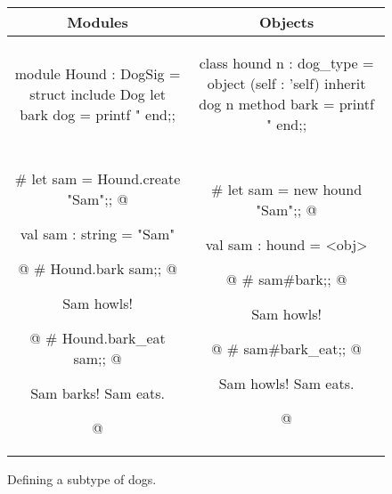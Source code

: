 \begin{figure}
\begin{center}
\begin{tabular}{c|c}
Modules & Objects\\
\hline\hline
\begin{minipage}[t]{2in}
\begin{ocamllisting}
module Hound : DogSig = struct
   include Dog
   let bark dog =
     printf "%
end;;
\end{ocamllisting}
\end{minipage}
&
\begin{minipage}[t]{2in}
\begin{ocamllisting}
class hound n : dog_type =
  object (self : 'self)
    inherit dog n
    method bark =
      printf "%
  end;;
\end{ocamllisting}
\end{minipage}
\\
\begin{minipage}[t]{2in}
\begin{ocamllistingx}
# let sam = Hound.create "Sam";;
@
\begin{topoutput}
val sam : string = "Sam"
\end{topoutput}
@
# Hound.bark sam;;
@
\begin{topoutput}
Sam howls!
\end{topoutput}
@
# Hound.bark_eat sam;;
@
\begin{topoutput}
Sam barks!
Sam eats.
\end{topoutput}
@
\end{ocamllistingx}
\end{minipage}
&
\begin{minipage}[t]{2in}
\begin{ocamllistingx}
# let sam = new hound "Sam";;
@
\begin{topoutput}
val sam : hound = <obj>
\end{topoutput}
@
# sam#bark;;
@
\begin{topoutput}
Sam howls!
\end{topoutput}
@
# sam#bark_eat;;
@
\begin{topoutput}
Sam howls!
Sam eats.
\end{topoutput}
@
\end{ocamllistingx}
\end{minipage}
\end{tabular}
\end{center}
\caption{Defining a subtype of dogs.}
\end{figure}

